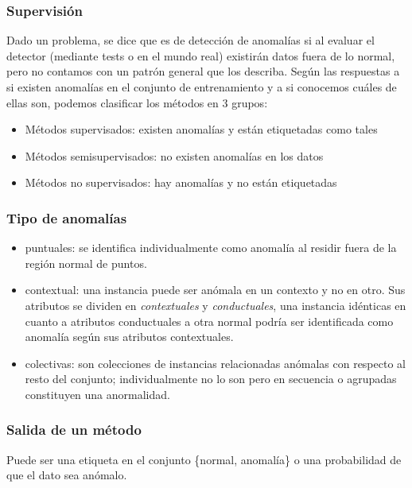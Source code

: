\documentclass[a4paper,11pt,spanish]{report}
\let\stdsubsub\subsubsection
\renewcommand{\subsection}{\stdsubsub}
\begin{document}
\subsection*{Supervisión}
\label{sec-2-1-1-2}

Dado un problema, se dice que es de detección de anomalías si al evaluar el detector (mediante tests o en el mundo real) existirán datos fuera de lo normal, pero no contamos con un patrón general que los describa. Según las respuestas a si existen anomalías en el conjunto de entrenamiento y a si conocemos cuáles de ellas son, podemos clasificar los métodos en 3 grupos:
\begin{itemize}
\item Métodos supervisados: existen anomalías y están etiquetadas como tales
\item Métodos semisupervisados: no existen anomalías en los datos
\item Métodos no supervisados: hay anomalías y no están etiquetadas
\end{itemize}

\subsection*{Tipo de anomalías}
\label{sec-2-1-1-3}

\begin{itemize}
\item puntuales: se identifica individualmente como anomalía al residir fuera de la región normal de puntos.
\item contextual: una instancia puede ser anómala en un contexto y no en otro. Sus atributos se dividen en \emph{contextuales} y \emph{conductuales}, una instancia idénticas en cuanto a atributos conductuales a otra normal podría ser identificada como anomalía según sus atributos contextuales.
\item colectivas: son colecciones de instancias relacionadas anómalas con respecto al resto del conjunto; individualmente no lo son pero en secuencia o agrupadas constituyen una anormalidad.
\end{itemize}

\subsection*{Salida de un método}
\label{sec-2-1-1-4}

Puede ser una etiqueta en el conjunto \{normal, anomalía\} o una probabilidad de que el dato sea anómalo.
\end{document}
